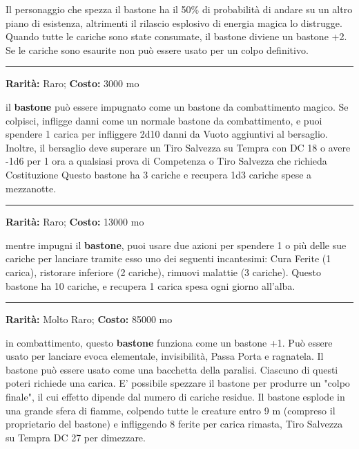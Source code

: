 \begin{multicols}{2}
Il personaggio che spezza il bastone ha il 50\% di probabilità di andare su un altro piano di esistenza, altrimenti il rilascio esplosivo di energia magica lo distrugge. Quando tutte le cariche sono state consumate, il bastone diviene un bastone +2. Se le cariche sono esaurite non può essere usato per un colpo definitivo.

\smallskip\noindent\rule{\linewidth}{2pt}  \hypertarget{Bastonedell'Avvizzimento}{}\smallskip{}\noindent\label{Bastonedell'Avvizzimento}

\textbf{Rarità:} Raro; \textbf{Costo:} 3000 mo

il \textbf{bastone} può essere impugnato come un bastone da combattimento magico. Se colpisci, infligge danni come un normale bastone da combattimento, e puoi spendere 1 carica per infliggere 2d10 danni da Vuoto aggiuntivi al bersaglio. Inoltre, il bersaglio deve superare un Tiro Salvezza su Tempra con DC 18 o avere -1d6 per 1 ora a qualsiasi prova di Competenza o Tiro Salvezza che richieda Costituzione Questo bastone ha 3 cariche e recupera 1d3 cariche spese a mezzanotte.

\smallskip\noindent\rule{\linewidth}{2pt}  \hypertarget{BastonedellaGuarigione}{}\smallskip{}\noindent\label{BastonedellaGuarigione}

\textbf{Rarità:} Raro; \textbf{Costo:} 13000 mo

mentre impugni il \textbf{bastone}, puoi usare due azioni per spendere 1 o più delle sue cariche per lanciare tramite esso uno dei seguenti incantesimi: Cura Ferite (1 carica), ristorare inferiore (2 cariche), rimuovi malattie (3 cariche). Questo bastone ha 10 cariche, e recupera 1 carica spesa ogni giorno all'alba.

\smallskip\noindent\rule{\linewidth}{2pt}  \hypertarget{BastonedellaStregoneria}{}\smallskip{}\noindent\label{BastonedellaStregoneria}

\textbf{Rarità:} Molto Raro; \textbf{Costo:} 85000 mo

in combattimento, questo \textbf{bastone} funziona come un bastone +1. Può essere usato per lanciare evoca elementale, invisibilità, Passa Porta e ragnatela. Il bastone può essere usato come una bacchetta della paralisi. Ciascuno di questi poteri richiede una carica. E' possibile spezzare il bastone per produrre un "colpo finale", il cui effetto dipende dal numero di cariche residue. Il bastone esplode in una grande sfera di fiamme, colpendo tutte le creature entro 9 m (compreso il proprietario del bastone) e infliggendo 8 ferite per carica rimasta, Tiro Salvezza su Tempra DC 27 per dimezzare.


\end{multicols}
